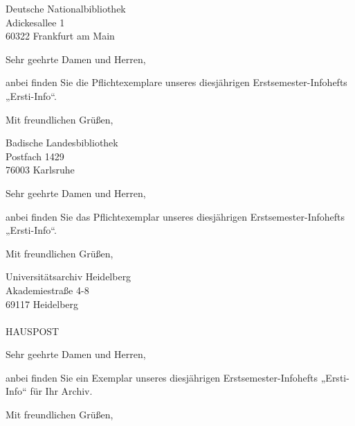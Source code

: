 \documentclass{mathphys-letter}
\begin{document}
        \begin{letter}{Deutsche Nationalbibliothek\\Adickesallee 1\\60322 Frankfurt am Main}
                \opening{Sehr geehrte Damen und Herren,}
                anbei finden Sie die Pflichtexemplare unseres diesjährigen Erstsemester-Infohefts „Ersti-Info“.
                \closing{Mit freundlichen Grüßen,}
        \end{letter}
        \begin{letter}{Badische Landesbibliothek\\Postfach 1429\\76003 Karlsruhe}
                \opening{Sehr geehrte Damen und Herren,}
                anbei finden Sie das Pflichtexemplar unseres diesjährigen Erstsemester-Infohefts „Ersti-Info“.
                \closing{Mit freundlichen Grüßen,}
        \end{letter}
        \begin{letter}{Universitätsarchiv Heidelberg\\Akademiestraße 4-8\\69117 Heidelberg\\\quad\\HAUSPOST}
                \opening{Sehr geehrte Damen und Herren,}
                anbei finden Sie ein Exemplar unseres diesjährigen Erstsemester-Infohefts „Ersti-Info“ für Ihr Archiv.
                \closing{Mit freundlichen Grüßen,}
        \end{letter}
\end{document}
